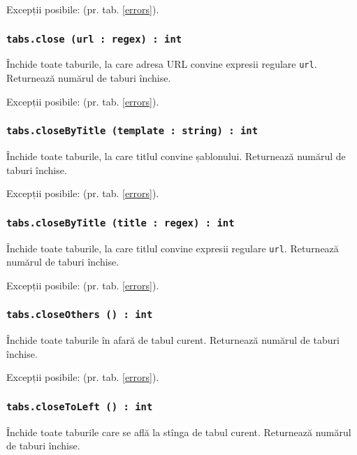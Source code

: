 Excepții posibile:  (pr. tab. \ref{errors}).

\subsubsection{\texttt{tabs.close (url : regex) : int}}

Închide toate taburile, la care adresa URL convine expresii regulare \texttt{url}. Returnează numărul de taburi închise.

Excepții posibile:  (pr. tab. \ref{errors}).

\subsubsection{\texttt{tabs.closeByTitle (template : string) : int}}

Închide toate taburile, la care titlul convine șablonului. Returnează numărul de taburi închise.

Excepții posibile:  (pr. tab. \ref{errors}).

\subsubsection{\texttt{tabs.closeByTitle (title : regex) : int}}

Închide toate taburile, la care titlul convine expresii regulare \texttt{url}. Returnează numărul de taburi închise.

Excepții posibile:  (pr. tab. \ref{errors}).

\subsubsection{\texttt{tabs.closeOthers () : int}}

Închide toate taburile în afară de tabul curent. Returnează numărul de taburi închise.

Excepții posibile:  (pr. tab. \ref{errors}).

\subsubsection{\texttt{tabs.closeToLeft () : int}}

Închide toate taburile care se află la stînga de tabul curent. Returnează numărul de taburi închise.

